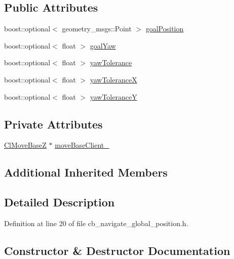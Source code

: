 \subsection*{Public Attributes}
\begin{DoxyCompactItemize}
\item 
boost\+::optional$<$ geometry\+\_\+msgs\+::\+Point $>$ \hyperlink{classcl__move__base__z_1_1CbNavigateGlobalPosition_a51a0266fd9a63e99f26e88933529c559}{goal\+Position}
\item 
boost\+::optional$<$ float $>$ \hyperlink{classcl__move__base__z_1_1CbNavigateGlobalPosition_a839900de7f664b27c9be189fadbaa003}{goal\+Yaw}
\item 
boost\+::optional$<$ float $>$ \hyperlink{classcl__move__base__z_1_1CbNavigateGlobalPosition_af7c005e386a5062091618384534cd2b9}{yaw\+Tolerance}
\item 
boost\+::optional$<$ float $>$ \hyperlink{classcl__move__base__z_1_1CbNavigateGlobalPosition_a3e649f9ae9f1118c4f08332e4d5908dc}{yaw\+ToleranceX}
\item 
boost\+::optional$<$ float $>$ \hyperlink{classcl__move__base__z_1_1CbNavigateGlobalPosition_a2405f30f99b72c7daae79175f3e78677}{yaw\+ToleranceY}
\end{DoxyCompactItemize}
\subsection*{Private Attributes}
\begin{DoxyCompactItemize}
\item 
\hyperlink{classcl__move__base__z_1_1ClMoveBaseZ}{Cl\+Move\+BaseZ} $\ast$ \hyperlink{classcl__move__base__z_1_1CbNavigateGlobalPosition_a460d6b43834cb52baa94d22cd3a6fd2b}{move\+Base\+Client\+\_\+}
\end{DoxyCompactItemize}
\subsection*{Additional Inherited Members}


\subsection{Detailed Description}


Definition at line 20 of file cb\+\_\+navigate\+\_\+global\+\_\+position.\+h.



\subsection{Constructor \& Destructor Documentation}
\mbox{\label{classcl__move__base__z_1_1CbNavigateGlobalPosition_aec75d2481b2057bbbdad9513c4dc08cd}} 
